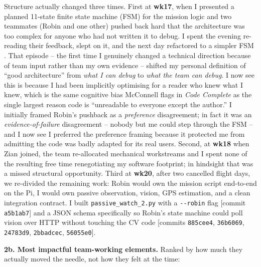 Structure actually changed three times. First at \textbf{wk17}, when I presented a planned 11-state finite state machine (FSM) for the mission logic and two teammates (Robin and one other) pushed back hard that the architecture was too complex for anyone who had not written it to debug. I spent the evening re-reading their feedback, slept on it, and the next day refactored to a simpler FSM \cite{mainrefactor}. That episode -- the first time I genuinely changed a technical direction because of team input rather than my own evidence -- shifted my personal definition of ``good architecture'' from \textit{what I can debug} to \textit{what the team can debug}. I now see this is because I had been implicitly optimising for a reader who knew what I knew, which is the same cognitive bias McConnell flags in \textit{Code Complete} \cite{mcconnell2004} as the single largest reason code is ``unreadable to everyone except the author.'' I initially framed Robin's pushback as a \textit{preference} disagreement; in fact it was an \textit{evidence-of-failure} disagreement -- nobody but me could step through the FSM -- and I now see I preferred the preference framing because it protected me from admitting the code was badly adapted for its real users. Second, at \textbf{wk18} when Zian joined, the team re-allocated mechanical workstreams and I spent none of the resulting free time renegotiating my software footprint; in hindsight that was a missed structural opportunity. Third at \textbf{wk20}, after two cancelled flight days, we re-divided the remaining work: Robin would own the mission script end-to-end on the Pi, I would own passive observation, vision, GPS estimation, and a clean integration contract. I built \texttt{passive\_watch\_2.py} with a \texttt{-{}-robin} flag [commit \texttt{a5b1ab7}] and a JSON schema \cite{robinhandoff} specifically so Robin's state machine could poll vision over HTTP without touching the CV code [commits \texttt{885cee4}, \texttt{36b6069}, \texttt{24783d9}, \texttt{2bbadcec}, \texttt{56055e0}].

\textbf{2b. Most impactful team-working elements.}  Ranked by how much they actually moved the needle, not how they felt at the time:

